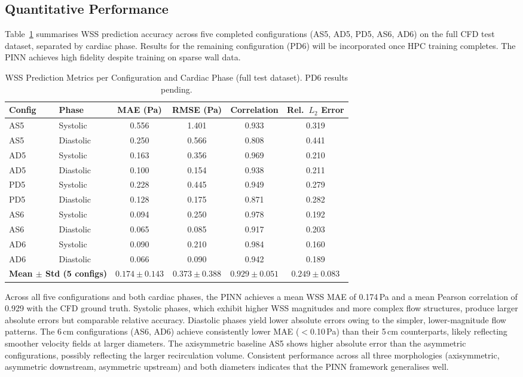 \documentclass[11pt,a4paper]{article}
\begin{document}
\subsection{Quantitative Performance}

Table~\ref{tab:performance} summarises WSS prediction accuracy across five completed configurations (AS5, AD5, PD5, AS6, AD6) on the full CFD test dataset, separated by cardiac phase. Results for the remaining configuration (PD6) will be incorporated once HPC training completes. The PINN achieves high fidelity despite training on sparse wall data.

\begin{table}[H]
\centering
\caption{WSS Prediction Metrics per Configuration and Cardiac Phase (full test dataset). PD6 results pending.}
\label{tab:performance}
\begin{tabular}{llcccc}
\toprule
\textbf{Config} & \textbf{Phase} & \textbf{MAE (Pa)} & \textbf{RMSE (Pa)} & \textbf{Correlation} & \textbf{Rel.\ $L_2$ Error} \\
\midrule
AS5 & Systolic  & 0.556 & 1.401 & 0.933 & 0.319 \\
AS5 & Diastolic & 0.250 & 0.566 & 0.808 & 0.441 \\
AD5 & Systolic  & 0.163 & 0.356 & 0.969 & 0.210 \\
AD5 & Diastolic & 0.100 & 0.154 & 0.938 & 0.211 \\
PD5 & Systolic  & 0.228 & 0.445 & 0.949 & 0.279 \\
PD5 & Diastolic & 0.128 & 0.175 & 0.871 & 0.282 \\
AS6 & Systolic  & 0.094 & 0.250 & 0.978 & 0.192 \\
AS6 & Diastolic & 0.065 & 0.085 & 0.917 & 0.203 \\
AD6 & Systolic  & 0.090 & 0.210 & 0.984 & 0.160 \\
AD6 & Diastolic & 0.066 & 0.090 & 0.942 & 0.189 \\
\midrule
\multicolumn{2}{l}{\textbf{Mean $\pm$ Std (5 configs)}} & $\mathbf{0.174 \pm 0.143}$ & $\mathbf{0.373 \pm 0.388}$ & $\mathbf{0.929 \pm 0.051}$ & $\mathbf{0.249 \pm 0.083}$ \\
\bottomrule
\end{tabular}
\end{table}

Across all five configurations and both cardiac phases, the PINN achieves a mean WSS MAE of 0.174\,Pa and a mean Pearson correlation of 0.929 with the CFD ground truth. Systolic phases, which exhibit higher WSS magnitudes and more complex flow structures, produce larger absolute errors but comparable relative accuracy. Diastolic phases yield lower absolute errors owing to the simpler, lower-magnitude flow patterns. The 6\,cm configurations (AS6, AD6) achieve consistently lower MAE ($<$0.10\,Pa) than their 5\,cm counterparts, likely reflecting smoother velocity fields at larger diameters. The axisymmetric baseline AS5 shows higher absolute error than the asymmetric configurations, possibly reflecting the larger recirculation volume. Consistent performance across all three morphologies (axisymmetric, asymmetric downstream, asymmetric upstream) and both diameters indicates that the PINN framework generalises well.
\end{document}
